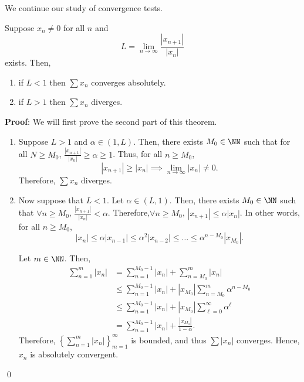 
\noindent We continue our study of convergence tests.

\begin{theorem}
Suppose $x_n \neq 0$ for all $n$ and 
\[
L = \lim_{n\to \infty} \frac{|x_{n+1}|}{|x_n|}
\]
exists. Then,
\begin{enumerate}
\item if $L<1$ then $\sum x_n$ converges absolutely. 
\item if $L>1$ then $\sum x_n$ diverges.
\end{enumerate}
\end{theorem}
\textbf{Proof}: We will first prove the second part of this theorem. 
\begin{enumerate}
    \item[2)] Suppose $L >1$ and $\alpha \in (1,L)$. Then, there exists $M_0 \in \NN$ such that for all $N\geq M_0$, $\frac{|x_{n+1}|}{|x_n|} \geq \alpha \geq 1$. Thus, for all $n\geq M_0$,
\[
|x_{n+1}| \geq |x_n| \implies \lim_{n\to \infty} |x_n| \neq 0.
\]
Therefore, $\sum x_n$ diverges.

\item[1)] Now suppose that $L<1$. Let $\alpha \in (L,1)$. Then, there exists $M_0 \in \NN$ such that $\forall n\geq M_0$, $\frac{|x_{n+1}|}{|x_n|}< \alpha$. Therefore,$\forall n\geq M_0$, $|x_{n+1}| \leq \alpha |x_n|$. In other words, for all $n\geq M_0$,
\[
|x_n| \leq \alpha |x_{n-1}| \leq\alpha^2 |x_{n-2}| \leq \dots \leq \alpha^{n-M_0} |x_{M_0}|.
\]

Let $m\in \NN$. Then, 
\begin{align*}
    \sum_{n=1}^m |x_n| &= \sum_{n=1}^{M_0-1} |x_n| + \sum_{n=M_0}^m |x_n| \\
    &\leq \sum_{n=1}^{M_0-1} |x_n| + |x_{M_0}|\sum_{n=M_0}^m \alpha^{n-M_0} \\
    &\leq \sum_{n=1}^{M_0-1} |x_n| + |x_{M_0}| \sum_{\ell = 0}^\infty \alpha^\ell \\
    &= \sum_{n=1}^{M_0-1} |x_n| + \frac{|x_{M_0}|}{1-\alpha}.
\end{align*}
Therefore, $\left\{\sum_{n=1}^m |x_n|\right\}_{m=1}^\infty$ is bounded, and thus $\sum |x_n|$ converges. Hence, $x_n$ is absolutely convergent.
\end{enumerate}\qed 


